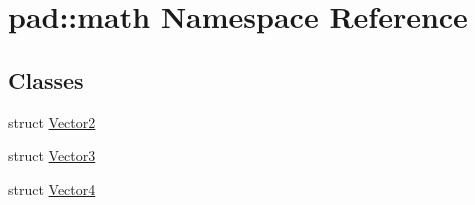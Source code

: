 \hypertarget{namespacepad_1_1math}{}\section{pad\+:\+:math Namespace Reference}
\label{namespacepad_1_1math}
\subsection*{Classes}
\begin{DoxyCompactItemize}
\item 
struct \mbox{\hyperlink{structpad_1_1math_1_1_vector2}{Vector2}}
\item 
struct \mbox{\hyperlink{structpad_1_1math_1_1_vector3}{Vector3}}
\item 
struct \mbox{\hyperlink{structpad_1_1math_1_1_vector4}{Vector4}}
\end{DoxyCompactItemize}

